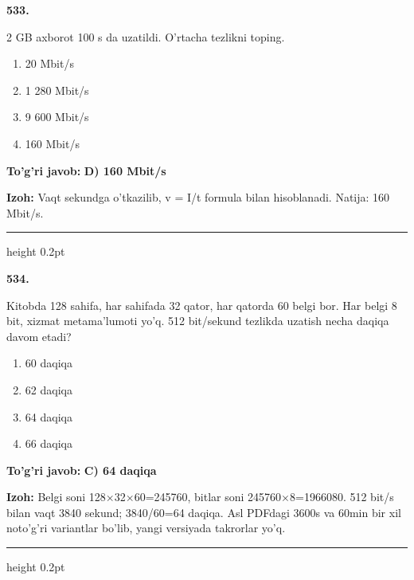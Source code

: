 \documentclass[10pt,a4paper,oneside]{article}
\begin{document}
\noindent\textbf{\color{ink}533.}
\par
2 GB axborot 100 s da uzatildi. O'rtacha tezlikni toping.
\begin{enumerate}[label=\Alph*),leftmargin=9mm]
\item 20 Mbit/s
\item 1 280 Mbit/s
\item 9 600 Mbit/s
\item 160 Mbit/s
\end{enumerate}
\begin{tcolorbox}[enhanced,breakable,colback=teal!4,colframe=teal!50!black,boxrule=0.5pt,arc=1.1mm,left=3mm,right=3mm,top=1.7mm,bottom=1.7mm,before skip=2mm,after skip=2mm]
\textbf{\color{teal}To'g'ri javob:} \textbf{D) 160 Mbit/s}
\par\smallskip
\textbf{Izoh:} Vaqt sekundga o'tkazilib, v = I/t formula bilan hisoblanadi. Natija: 160 Mbit/s.
\end{tcolorbox}
\vspace{2mm}\hrule height 0.2pt \vspace{3mm}

\noindent\textbf{\color{ink}534.}
\par
Kitobda 128 sahifa, har sahifada 32 qator, har qatorda 60 belgi bor. Har belgi 8 bit, xizmat metama'lumoti yo'q. 512 bit/sekund tezlikda uzatish necha daqiqa davom etadi?
\begin{enumerate}[label=\Alph*),leftmargin=9mm]
\item 60 daqiqa
\item 62 daqiqa
\item 64 daqiqa
\item 66 daqiqa
\end{enumerate}
\begin{tcolorbox}[enhanced,breakable,colback=teal!4,colframe=teal!50!black,boxrule=0.5pt,arc=1.1mm,left=3mm,right=3mm,top=1.7mm,bottom=1.7mm,before skip=2mm,after skip=2mm]
\textbf{\color{teal}To'g'ri javob:} \textbf{C) 64 daqiqa}
\par\smallskip
\textbf{Izoh:} Belgi soni 128\ensuremath{\times}32\ensuremath{\times}60=245760, bitlar soni 245760\ensuremath{\times}8=1966080. 512 bit/s bilan vaqt 3840 sekund; 3840/60=64 daqiqa. Asl PDFdagi 3600s va 60min bir xil noto'g'ri variantlar bo'lib, yangi versiyada takrorlar yo'q.
\end{tcolorbox}
\vspace{2mm}\hrule height 0.2pt \vspace{3mm}
\end{document}
